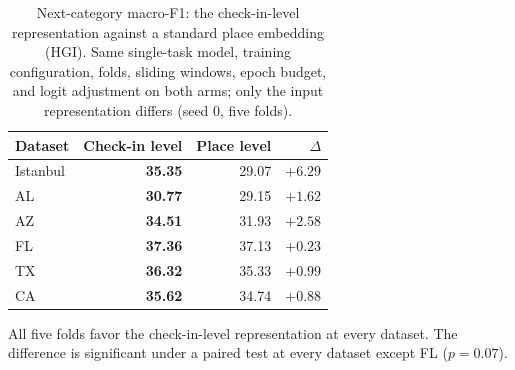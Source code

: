 \providecommand{\sd}[1]{\,{\scriptsize$\pm$#1}}
\begin{table}[!t]
\caption{Next-category macro-F1: the check-in-level representation against a standard place
embedding (HGI). Same single-task model, training configuration, folds, sliding windows, epoch
budget, and logit adjustment on both arms; only the input representation differs (seed 0, five
folds).}
\label{tab:substrate}
\centering
\begin{tabular}{l r r r}
\hline
\textbf{Dataset} & \textbf{Check-in level} & \textbf{Place level} & \textbf{$\Delta$} \\
\hline
Istanbul & \textbf{35.35} & 29.07 & $+6.29$ \\
AL & \textbf{30.77} & 29.15 & $+1.62$ \\
AZ & \textbf{34.51} & 31.93 & $+2.58$ \\
FL & \textbf{37.36} & 37.13 & $+0.23$ \\
TX & \textbf{36.32} & 35.33 & $+0.99$ \\
CA & \textbf{35.62} & 34.74 & $+0.88$ \\
\hline
\end{tabular}

\vspace{2pt}
{\footnotesize All five folds favor the check-in-level representation at every dataset. The
difference is significant under a paired test at every dataset except FL ($p=0.07$).}
\end{table}

